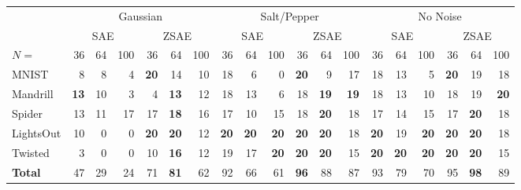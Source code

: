 \begin{table}[htbp]
\centering
\setlength{\tabcolsep}{0.2em}
\begin{tabular}{|l|*{3}{r}|*{3}{r}|*{3}{r}|*{3}{r}|*{3}{r}|*{3}{r}|}
 & \multicolumn{6}{c|}{Gaussian} & \multicolumn{6}{c|}{Salt/Pepper} & \multicolumn{6}{c|}{No Noise}                                                                                    \\
 & \multicolumn{3}{c|}{SAE}     & \multicolumn{3}{c|}{ZSAE}      & \multicolumn{3}{c|}{SAE} & \multicolumn{3}{c|}{ZSAE} & \multicolumn{3}{c|}{SAE} & \multicolumn{3}{c|}{ZSAE} \\
$N=$ & {36} & {64} & {100} & {36} & {64} & {100} & {36} & {64} & {100} & {36} & {64} & {100} & {36} & {64} & {100} & {36} & {64} & {100} \\
\hline
MNIST     & 8           & 8  & 4  & \textbf{20} & 14          & 10 & 18          & 6           & 0           & \textbf{20} & 9           & 17          & 18          & 13          & 5           & \textbf{20} & 19          & 18          \\
Mandrill  & \textbf{13} & 10 & 3  & 4           & \textbf{13} & 12 & 18          & 13          & 6           & 18          & \textbf{19} & \textbf{19} & 18          & 13          & 10          & 18          & 19          & \textbf{20} \\
Spider    & 13          & 11 & 17 & 17          & \textbf{18} & 16 & 17          & 10          & 15          & 18          & \textbf{20} & 18          & 17          & 14          & 15          & 17          & \textbf{20} & 18          \\
LightsOut & 10          & 0  & 0  & \textbf{20} & \textbf{20} & 12 & \textbf{20} & \textbf{20} & \textbf{20} & \textbf{20} & \textbf{20} & 18          & \textbf{20} & 19          & \textbf{20} & \textbf{20} & \textbf{20} & 18          \\
Twisted   & 3           & 0  & 0  & 10          & \textbf{16} & 12 & 19          & 17          & \textbf{20} & \textbf{20} & \textbf{20} & 15          & \textbf{20} & \textbf{20} & \textbf{20} & \textbf{20} & \textbf{20} & 15          \\
\hline
\textbf{Total} & {47} & {29} & {24}  & {71} & \textbf{81} & {62}  & {92} & {66} & {61}  & \textbf{96} & {88} & {87}  & {93} & {79} & {70}  & {95} & \textbf{98} & {89}  \\
\hline
\end{tabular}

\end{table}
